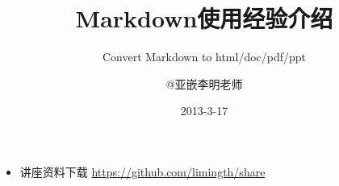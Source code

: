 \documentclass[10pt]{beamer}
\title{Markdown使用经验介绍}
\subtitle{Convert Markdown to html/doc/pdf/ppt}
\author{@亚嵌李明老师}
\date{2013-3-17}
\institute{http://weibo.com/limingth}
\begin{document}
\begin{frame}
\titlepage
\begin{itemize}
\item 	讲座资料下载 \url{https://github.com/limingth/share}
\end{itemize}
\end{frame}


\end{document}
